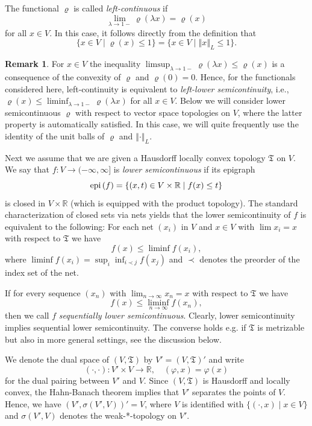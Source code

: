 \documentclass[a4paper,11pt,reqno]{amsart}
\theoremstyle{definition}
\newtheorem{remark}[lemma]{Remark}
\numberwithin{equation}{section}
\newcommand{\R}{{\mathbb R}}
\newcommand{\vr}{{\varrho}}
\newcommand{\av}[1]{\left\Vert #1\right\Vert}
\newcommand{\1}{\mathds{1}}
\begin{document}
The functional $\vr$ is called {\em left-continuous} if 
%
$$\lim_{\lambda \to 1-} \vr(\lambda x) = \vr(x)$$
%
for all $x \in V$. In this case, it follows directly from the definition that
%
$$\{x \in V \mid \vr(x) \leq 1\} = \{x \in V \mid \av{x}_L \leq 1\}.$$
%
\begin{remark}
For $x \in V$ the inequality  $\limsup_{\lambda \to 1-} \vr(\lambda x) \leq \vr(x)$ is a consequence of the convexity of $\vr$ and $\vr(0) = 0$. Hence, for the functionals considered here, left-continuity is equivalent to {\em left-lower semicontinuity}, i.e.,  $\vr(x) \leq \liminf_{\lambda \to 1-} \vr(\lambda x)$ for all $x \in V$. Below we will consider lower semicontinuous $\vr$ with respect to vector space topologies on $V$, where the latter property is automatically satisfied. In this case, we will quite frequently use the identity of the unit balls of $\vr$ and $\av{\cdot}_L$.  
\end{remark}






Next we assume that we are given a Hausdorff locally convex topology $\mathfrak{T}$ on $V$. We say that $f \colon V \to (-\infty,\infty]$ is {\em lower semicontinuous} if its epigraph 
%
$${\rm epi}\,(f) =  \{(x,t) \in V \times \R \mid f(x) \leq t\}$$
%
is closed in $V \times \R$ (which is equipped with the product topology).  The standard characterization of closed sets via nets yields that the lower semicontinuity of $f$ is equivalent to the following: For each net $(x_i)$ in $V$ and $x \in V$ with $\lim x_i = x$ with respect to $\mathfrak{T}$ we have 
%
$$f(x) \leq \liminf f(x_i),$$
%
where $\liminf f(x_i) = \sup_i \inf_{i \prec j} f(x_j)$ and $\prec$ denotes the preorder of the index set of the net. 

If for every sequence $(x_n)$ with $\lim_{n \to \infty} x_n = x$ with respect to $\mathfrak{T}$ we have 
%
$$f(x) \leq \liminf_{n \to \infty} f(x_n),$$
%
then we call $f$ {\em sequentially lower semicontinuous}. Clearly, lower semicontinuity implies sequential lower semicontinuity. The converse holds e.g. if $\mathfrak{T}$ is metrizable but also in more general settings, see the discussion below.  

We denote the dual space of $(V,\mathfrak{T})$ by $V' = (V,\mathfrak{T})'$ and write 
%
$$(\cdot,\cdot) \colon V' \times V \to \R,\quad (\varphi,x) = \varphi(x)$$
%
for the dual pairing between $V'$ and $V$. Since $(V,\mathfrak{T})$ is Hausdorff and locally convex,  the Hahn-Banach theorem implies that $V'$ separates the points of $V$. Hence, we have  $(V',\sigma(V',V))' = V$, where $V$ is identified with $\{(\cdot,x) \mid x \in V\}$ and $\sigma(V',V)$ denotes the weak-*-topology on $V'$.
\end{document}
